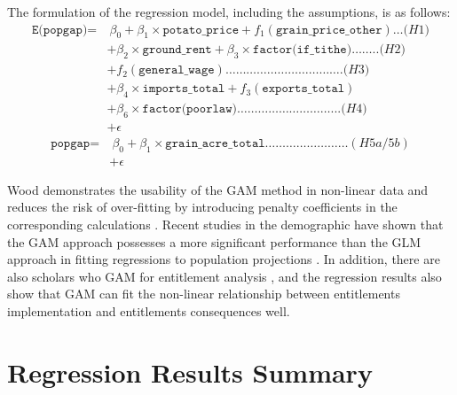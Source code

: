 The formulation of the regression model, including the assumptions, is as follows:
\vspace{-14pt}
\begin{align*}
\texttt{E(popgap)} = & \ \beta_0 + \beta_1 \times \texttt{potato\_price} + f_1(\texttt{grain\_price\_other}) \ldots \textit{(H1)} \\
                & + \beta_2 \times \texttt{ground\_rent} + \beta_3 \times \texttt{factor(if\_tithe)} \ldots \ldots .. \textit{(H2)} \\
                & + f_2(\texttt{general\_wage}) \ldots \ldots \ldots \ldots \ldots \ldots \ldots \ldots \ldots \ldots \ldots . \textit{(H3)} \\
                & + \beta_4 \times \texttt{imports\_total} + f_3(\texttt{exports\_total})\\
                & + \beta_6 \times \texttt{factor(poorlaw)} \ldots \ldots \ldots \ldots \ldots \ldots \ldots \ldots \ldots . .. \textit{(H4)} \\
                & + \epsilon
\end{align*}
\vspace{-2cm}
\begin{align*}
\texttt{popgap} = & \ \beta_0 + \beta_1 \times \texttt{grain\_acre\_total}  \ldots \ldots \ldots  \ldots \ldots \ldots \ldots \ldots (\textit{H5a/5b}) \\
& + \epsilon
\end{align*}

Wood demonstrates the usability of the GAM method in  non-linear data and reduces the risk of over-fitting by introducing penalty coefficients in the corresponding calculations \citep{wood2001mgcv}. Recent studies in the demographic have shown that the GAM approach possesses a more significant performance than the GLM approach in fitting regressions to population projections \citep{potts2018evaluation}. In addition, there are also scholars who GAM for entitlement analysis \citep{ardyanto2006granting}, and the regression results also show that GAM can fit the non-linear relationship between entitlements implementation and entitlements consequences well.

\section{Regression Results Summary}


